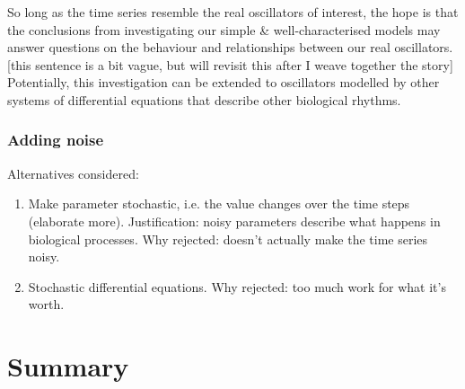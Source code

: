 So long as the time series resemble the real oscillators of interest, the hope is that the conclusions from investigating our simple \& well-characterised models may answer questions on the behaviour and relationships between our real oscillators. [this sentence is a bit vague, but will revisit this after I weave together the story]  Potentially, this investigation can be extended to oscillators modelled by other systems of differential equations that describe other biological rhythms.

\subsubsection{Adding noise}
\label{sec:analysis-corelation-discussion-noise}

Alternatives considered:

\begin{enumerate}
\item Make parameter stochastic, i.e. the value changes over the time steps (elaborate more).  Justification: noisy parameters describe what happens in biological processes.  Why rejected: doesn't actually make the time series noisy.

\item Stochastic differential equations.  Why rejected: too much work for what it's worth.
\end{enumerate}

\section{Summary}
\label{sec:analysis-summary}
